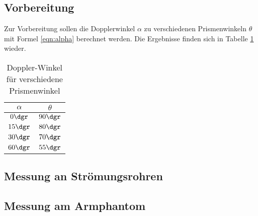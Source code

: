 \subsection{Vorbereitung}
Zur Vorbereitung sollen die Dopplerwinkel $\alpha$ zu verschiedenen Prismenwinkeln
$\theta$
mit Formel \eqref{eqn:alpha} berechnet werden. Die Ergebnisse finden sich in
Tabelle \ref{tab:alpha} wieder.
\begin{table}
  \centering
  \begin{tabular}{c|c}
    \toprule
    $\alpha$ & $\theta$ \\
    \midrule
    $ 0\dgr$ & $90\dgr$ \\
    $15\dgr$ & $80\dgr$ \\
    $30\dgr$ & $70\dgr$ \\
    $60\dgr$ & $55\dgr$ \\
    \bottomrule
  \end{tabular}
  \caption{Doppler-Winkel für verschiedene Prismenwinkel}
  \label{tab:alpha}
\end{table}
\subsection{Messung an Strömungsrohren}

\subsection{Messung am Armphantom}

